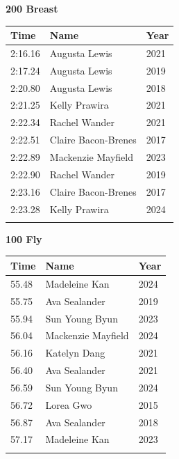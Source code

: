 \vspace{1.2em}
\noindent\begin{minipage}[t]{0.48\textwidth}
\centering
\textbf{\textcolor{teamprimary}{200 Breast}}\par
\vspace{0.5em}
\centering
\small
\renewcommand{\arraystretch}{1.0}
\setlength{\tabcolsep}{4pt}
\begin{tabular}{@{}p{1.8cm}p{3.0cm}p{1.0cm}@{}}
\toprule
\textbf{Time} & \textbf{Name} & \textbf{Year} \\
\midrule
2:16.16 & Augusta Lewis & 2021 \\
2:17.24 & Augusta Lewis & 2019 \\
2:20.80 & Augusta Lewis & 2018 \\
2:21.25 & Kelly Prawira & 2021 \\
2:22.34 & Rachel Wander & 2021 \\
2:22.51 & Claire Bacon-Brenes & 2017 \\
2:22.89 & Mackenzie Mayfield & 2023 \\
2:22.90 & Rachel Wander & 2019 \\
2:23.16 & Claire Bacon-Brenes & 2017 \\
2:23.28 & Kelly Prawira & 2024 \\
\bottomrule
\vspace{0.5em}
\end{tabular}
\end{minipage}
\hfill
\begin{minipage}[t]{0.48\textwidth}
\centering
\textbf{\textcolor{teamprimary}{100 Fly}}\par
\vspace{0.5em}
\centering
\small
\renewcommand{\arraystretch}{1.0}
\setlength{\tabcolsep}{4pt}
\begin{tabular}{@{}p{1.8cm}p{3.0cm}p{1.0cm}@{}}
\toprule
\textbf{Time} & \textbf{Name} & \textbf{Year} \\
\midrule
55.48 & Madeleine Kan & 2024 \\
55.75 & Ava Sealander & 2019 \\
55.94 & Sun Young Byun & 2023 \\
56.04 & Mackenzie Mayfield & 2024 \\
56.16 & Katelyn Dang & 2021 \\
56.40 & Ava Sealander & 2021 \\
56.59 & Sun Young Byun & 2024 \\
56.72 & Lorea Gwo & 2015 \\
56.87 & Ava Sealander & 2018 \\
57.17 & Madeleine Kan & 2023 \\
\bottomrule
\vspace{0.5em}
\end{tabular}
\end{minipage}
